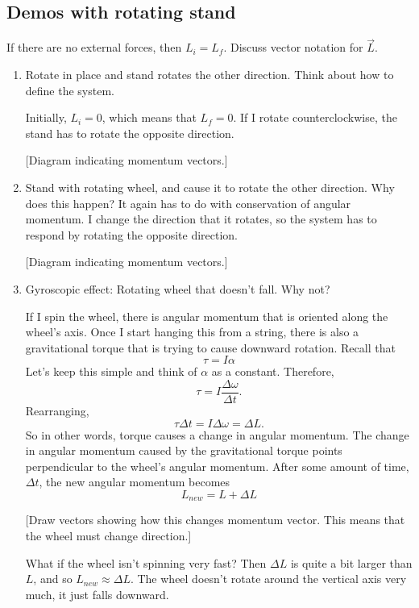\subsection{Demos with rotating stand}
If there are no external forces, then $L_i=L_f$. Discuss vector notation for $\vec L$.
\begin{enumerate}
\item Rotate in place and stand rotates the other direction. Think about how to define the system.

Initially, $L_i=0$, which means that $L_f=0$. If I rotate counterclockwise, the stand has to rotate the opposite direction.


[Diagram indicating momentum vectors.]\nopagebreak
\vspace{5cm}

\item Stand with rotating wheel, and cause it to rotate the other direction. Why does this happen? It again has to do with conservation of angular momentum. I change the direction that it rotates, so the system has to respond by rotating the opposite direction.

[Diagram indicating momentum vectors.]\nopagebreak
\vspace{5cm}


\item Gyroscopic effect: Rotating wheel that doesn't fall. Why not?

If I spin the wheel, there is angular momentum that is oriented along the wheel's axis. Once I start hanging this from a string, there is also a gravitational torque that is trying to cause downward rotation. Recall that 
$$\tau=I\alpha$$
Let's keep this simple and think of $\alpha$ as a constant. Therefore,
$$\tau=I\frac{\Delta\omega}{\Delta t}.$$
Rearranging,
$$\tau\Delta{t}=I\Delta\omega=\Delta{L}.$$
So in other words, torque causes a change in angular momentum. The change in angular momentum caused by the gravitational torque points perpendicular to the wheel's angular momentum. After some amount of time, $\Delta t$, the new angular momentum becomes
$$L_{new}=L+\Delta{L}$$

[Draw vectors showing how this changes momentum vector. This means that the wheel must change direction.]\nopagebreak
\vspace{5cm}

What if the wheel isn't spinning very fast? Then $\Delta L$ is quite a bit larger than $L$, and so $L_{new}\approx \Delta L$. The wheel doesn't rotate around the vertical axis very much, it just falls downward.
\end{enumerate}
\clearpage
